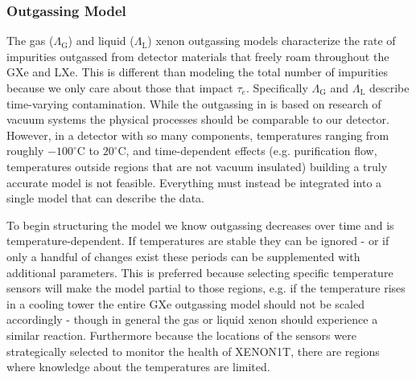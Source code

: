 \subsubsection{Outgassing Model}
\label{subsubsec:electron_lifetime_model_outgassing_model}
The gas ($\Lambda_{\mathrm{G}}$) and liquid ($\Lambda_{\mathrm{L}}$) xenon outgassing models characterize the rate of impurities outgassed
from detector materials that freely roam throughout the GXe and LXe.  This is different than modeling the total number of impurities
because we only care about those that impact $\tau_e$.  Specifically $\Lambda_{\mathrm{G}}$ and $\Lambda_{\mathrm{L}}$
describe time-varying contamination.  While the outgassing in
 is based on research of vacuum systems the physical processes should be
comparable to our detector.  However, in a detector with so
many components, temperatures ranging from roughly $-100^{\circ} \mathrm{C}$ to $20^{\circ} \mathrm{C}$, and time-dependent effects (e.g.
purification flow, temperatures outside regions that are not vacuum insulated) building a truly accurate model is not
feasible.  Everything must instead be integrated into a single model that can describe the data.

To begin structuring the model we know outgassing decreases over time and is temperature-dependent.  If temperatures
are stable they can be ignored - or if only a handful of changes exist these periods can be supplemented with
additional parameters.  This is preferred because selecting specific temperature sensors will make the model
partial to those regions, e.g. if the temperature rises in a cooling tower the entire GXe outgassing model should not be scaled
accordingly - though in general the gas or liquid xenon should experience a similar reaction.  Furthermore because the locations of the
sensors were strategically selected to monitor the health of XENON1T, there are regions where knowledge about the temperatures are
limited.

